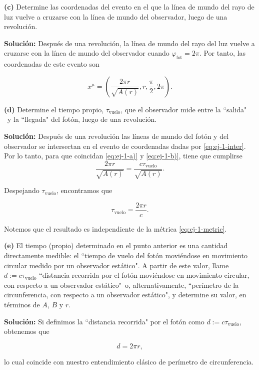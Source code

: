 \documentclass[letterpaper,11pt]{article}
\begin{document}
\textbf{(c)} Determine las coordenadas del evento en el que la línea de mundo del rayo de luz vuelve a cruzarse con la línea de mundo del observador, luego de una revolución.

\textbf{Solución:} Después de una revolución, la línea de mundo del rayo del luz vuelve a cruzarse con la línea de mundo del observador cuando $\varphi_{\text{fot}} = 2\pi$. Por tanto, las coordenadas de este evento son
\begin{shaded}
\begin{equation}
x^{\mu} = \left(\frac{2\pi r}{\sqrt{A(r)}},r,\frac{\pi}{2},2\pi\right). \label{eq:ej-1-inter}
\end{equation}
\end{shaded}

\textbf{(d)} Determine el tiempo propio, $\tau_{\text{vuelo}}$, que el observador mide entre la ``salida" \ y la ``llegada" del fotón, luego de una revolución.

\textbf{Solución:} Después de una revolución las líneas de mundo del fotón y del observador se intersectan en el evento de coordenadas dadas por \eqref{eq:ej-1-inter}. Por lo tanto, para que coincidan \eqref{eq:ej-1-a)} y \eqref{eq:ej-1-b)}, tiene que cumplirse 
\begin{equation}
\frac{2\pi r}{\sqrt{A(r)}} = \frac{c\tau_{\text{vuelo}}}{\sqrt{A(r)}}.
\end{equation}

Despejando $\tau_{\text{vuelo}}$, encontramos que 
\begin{shaded}
\begin{equation}
\tau_{\text{vuelo}} = \frac{2\pi r}{c}. \label{eq:ej-1-d)}
\end{equation}
\end{shaded}

Notemos que el resultado es independiente de la métrica \eqref{eq:ej-1-metric}.

\textbf{(e)} El tiempo (propio) determinado en el punto anterior es una cantidad directamente medible: el ``tiempo de vuelo del fotón moviéndose en movimiento circular medido por un observador estático". A partir de este valor, llame $d := c \tau_{\text{vuelo}}$ ``distancia recorrida por el fotón moviéndose en movimiento circular, con respecto a un observador estático"\ o, alternativamente, ``perímetro de la circunferencia, con respecto a un observador estático", y determine su valor, en términos de $A$, $B$ y $r$.

\textbf{Solución:} Si definimos la ``distancia recorrida" por el fotón como $d := c \tau_{\text{vuelo}}$, obtenemos que
\begin{shaded}
\begin{equation}
d = 2\pi r, \label{eq:ej-1-e)}
\end{equation}
\end{shaded}
lo cual coincide con nuestro entendimiento clásico de perímetro de circunferencia.
\end{document}
